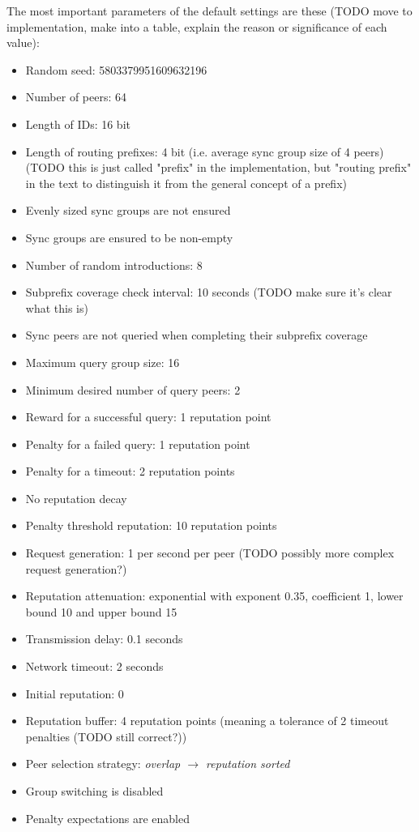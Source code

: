 The most important parameters of the default settings are these (TODO move to
implementation, make into a table, explain the reason or significance of each
value):
\begin{itemize}
\item Random seed: 5803379951609632196
\item Number of peers: 64
\item Length of IDs: 16 bit
\item Length of routing prefixes: 4 bit (i.e. average sync group size of 4
      peers) (TODO this is just called "prefix" in the implementation, but
      "routing prefix" in the text to distinguish it from the general concept of
      a prefix)
\item Evenly sized sync groups are not ensured
\item Sync groups are ensured to be non-empty
\item Number of random introductions: 8
\item Subprefix coverage check interval: 10 seconds (TODO make sure it's clear
      what this is)
\item Sync peers are not queried when completing their subprefix coverage
\item Maximum query group size: 16
\item Minimum desired number of query peers: 2
\item Reward for a successful query: 1 reputation point
\item Penalty for a failed query: 1 reputation point
\item Penalty for a timeout: 2 reputation points
\item No reputation decay
\item Penalty threshold reputation: 10 reputation points
\item Request generation: 1 per second per peer (TODO possibly more complex
      request generation?)
\item Reputation attenuation: exponential with exponent 0.35, coefficient 1,
      lower bound 10 and upper bound 15
\item Transmission delay: 0.1 seconds
\item Network timeout: 2 seconds
\item Initial reputation: 0
\item Reputation buffer: 4 reputation points (meaning a tolerance of 2 timeout
      penalties (TODO still correct?))
\item Peer selection strategy: \emph{overlap $\rightarrow$ reputation sorted}
\item Group switching is disabled
\item Penalty expectations are enabled
\end{itemize}

